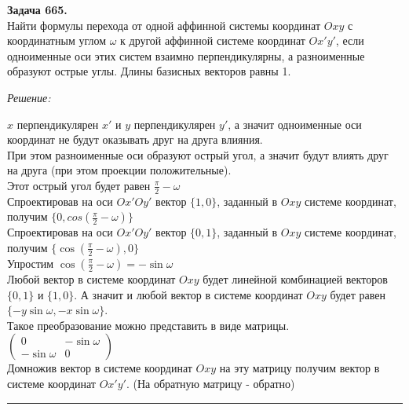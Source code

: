 \documentclass[a4paper, 12pt]{article}
\newenvironment{problem}[2][Задача]
    { \begin{mdframed}[backgroundcolor=gray!10] \textbf{#1 #2.} \\}
    {  \end{mdframed}}
\newenvironment{solution}
    {\textit{Решение: }}
    {\noindent\rule{7in}{1.5pt}}
\begin{document}
\begin{problem}{665}
Найти формулы перехода от одной аффинной системы координат $Oxy$ с координатным углом $\omega$
к другой аффинной системе координат $Ox'y'$, если одноименные оси этих систем взаимно перпендикулярны, а разноименные образуют острые углы.
Длины базисных векторов равны 1.
\end{problem}
\begin{solution}

$x$ перпендикулярен $x'$ и
$y$ перпендикулярен $y'$,
а значит одноименные оси координат не будут оказывать друг на друга влияния. \\
При этом разноименные оси образуют острый угол, а значит будут влиять друг на друга (при этом проекции положительные). \\
Этот острый угол будет равен $\frac{\pi}{2} - \omega$ \\
Спроектировав на оси $Ox' Oy'$ вектор $\{1, 0\}$, заданный в $Oxy$ системе координат, получим $\{0, cos(\frac{\pi}{2} - \omega)\}$ \\
Спроектировав на оси $Ox' Oy'$ вектор $\{0, 1\}$, заданный в $Oxy$ системе координат, получим $\{\cos(\frac{\pi}{2} - \omega), 0\}$ \\
Упростим $\cos(\frac{\pi}{2} - \omega) = -\sin{\omega}$ \\
Любой вектор в системе координат $Oxy$ будет линейной комбинацией векторов $\{0, 1\}$ и $\{1, 0\}$. А значит и любой вектор в системе координат $Oxy$ будет равен $\{-y\sin{\omega}, -x\sin{\omega}\}$. \\
Такое преобразование можно представить в виде матрицы. \\
$
\left(
  \begin{array}{rr}
    0 & -\sin{\omega} \\
    -\sin{\omega} & 0
  \end{array}
\right)
$
\\
Домножив вектор в системе координат $Oxy$ на эту матрицу получим вектор в системе координат $Ox'y'$.
(На обратную матрицу - обратно)

\end{solution}


\end{document}
